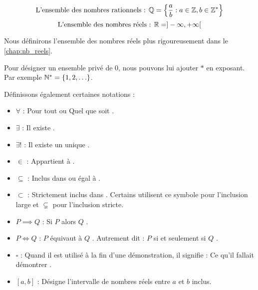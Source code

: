 \[ \text{L'ensemble des nombres rationnels : } \mathbb{Q} = \left\{ \frac{a}{b} : a \in \mathbb{Z}, b \in \mathbb{Z}^* \right\} \]
\[ \text{L'ensemble des nombres réels : } \mathbb{R} = ]-\infty, +\infty[ \]
\par \noindent Nous définirons l'ensemble des nombres réels plus rigoureusement dans le \autoref{chap:nb_reels}.
\\
\par \noindent Pour désigner un ensemble privé de 0, nous pouvons lui ajouter \og $*$ \fg en exposant. 
\\ 
Par exemple $\mathbb{N}^* = \{1, 2, \ldots\}$.
\\
\par \noindent Définissons également certaines notations :
\begin{itemize}
    \item $\forall$ : \og Pour tout \fg ou \og Quel que soit \fg.
    \item $\exists$ : \og Il existe \fg.
    \item $\exists!$ : \og Il existe un unique \fg.
    \item $\in$ : \og Appartient à \fg.
    \item $\subseteq$ : \og Inclus dans  ou égal à \fg.
    \item $\subset$ : \og Strictement inclus dans \fg. Certains utilisent ce symbole pour l'inclusion large et $\subsetneq$ pour l'inclusion stricte.
    \item $P \implies Q$ : \og Si $P$ alors $Q$ \fg.
    \item $P \iff Q$ : \og $P$ équivaut à $Q$ \fg. Autrement dit : \og $P$ si et seulement si $Q$ \fg.
    \item $\square$ : Quand il est utilisé à la fin d'une démonstration, il signifie : \og Ce qu'il fallait démontrer \fg.
    \item $[a, b]$ : Désigne l'intervalle de nombres réels entre $a$ et $b$ inclus.
\end{itemize}
